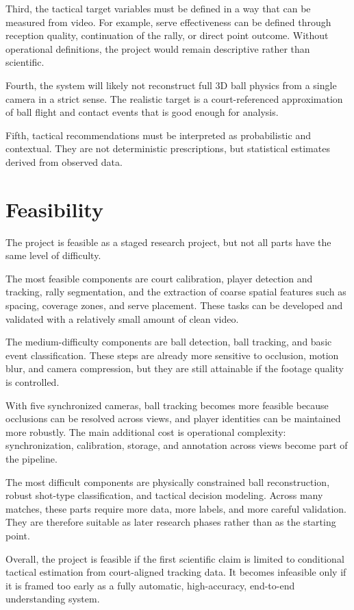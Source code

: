\documentclass[a4paper]{article}
\begin{document}
Third, the tactical target variables must be defined in a way that can be measured from video. For example, serve effectiveness can be defined through reception quality, continuation of the rally, or direct point outcome. Without operational definitions, the project would remain descriptive rather than scientific.

Fourth, the system will likely not reconstruct full 3D ball physics from a single camera in a strict sense. The realistic target is a court-referenced approximation of ball flight and contact events that is good enough for analysis.

Fifth, tactical recommendations must be interpreted as probabilistic and contextual. They are not deterministic prescriptions, but statistical estimates derived from observed data.

\section{Feasibility}
The project is feasible as a staged research project, but not all parts have the same level of difficulty.

The most feasible components are court calibration, player detection and tracking, rally segmentation, and the extraction of coarse spatial features such as spacing, coverage zones, and serve placement. These tasks can be developed and validated with a relatively small amount of clean video.

The medium-difficulty components are ball detection, ball tracking, and basic event classification. These steps are already more sensitive to occlusion, motion blur, and camera compression, but they are still attainable if the footage quality is controlled.

With five synchronized cameras, ball tracking becomes more feasible because occlusions can be resolved across views, and player identities can be maintained more robustly. The main additional cost is operational complexity: synchronization, calibration, storage, and annotation across views become part of the pipeline.

The most difficult components are physically constrained ball reconstruction, robust shot-type classification, and tactical decision modeling.
Across many matches, these parts require more data, more labels, and more careful validation. They are therefore suitable as later research phases rather than as the starting point.

Overall, the project is feasible if the first scientific claim is limited to conditional tactical estimation from court-aligned tracking data. It becomes infeasible only if it is framed too early as a fully automatic, high-accuracy, end-to-end understanding system.
\end{document}
